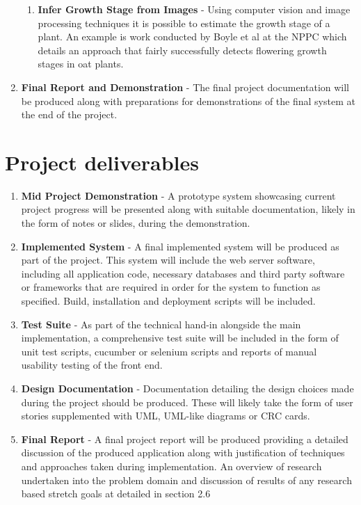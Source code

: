 \documentclass[11pt,fleqn,twoside]{article}
\begin{document}
\begin{enumerate}
\begin{enumerate}
\item \textbf{Infer Growth Stage from Images} - Using computer vision and image processing techniques it is possible to estimate the growth stage of a plant. An example is work conducted by Boyle et al \cite{boyle_image-based_2015} at the NPPC which details an approach that fairly successfully detects flowering growth stages in oat plants.
\end{enumerate}
\item \textbf{Final Report and Demonstration} - The final project documentation will be produced along with preparations for demonstrations of the final system at the end of the project.  
\end{enumerate}

\section{Project deliverables}
\begin{enumerate}
\item \textbf{Mid Project Demonstration} - A prototype system showcasing current project progress will be presented along with suitable documentation, likely in the form of notes or slides, during the demonstration.
\item \textbf{Implemented System} - A final implemented system will be produced as part of the project. This system will include the web server software, including all application code, necessary databases and third party software or frameworks that are required in order for the system to function as specified. Build, installation and deployment scripts will be included.
\item \textbf{Test Suite} - As part of the technical hand-in alongside the main implementation, a comprehensive test suite will be included in the form of unit test scripts, cucumber or selenium scripts and reports of manual usability testing of the front end.
\item \textbf{Design Documentation} - Documentation detailing the design choices made during the project should be produced. These will likely take the form of user stories supplemented with UML, UML-like diagrams or CRC cards.
\item \textbf{Final Report} - A final project report will be produced providing a detailed discussion of the produced application along with justification of techniques and approaches taken during implementation. An overview of research undertaken into the problem domain and discussion of results of any research based stretch goals at detailed in section 2.6

\end{enumerate}

\nocite{*} 



\renewcommand{\refname}{Annotated Bibliography}  
 
\end{document}
